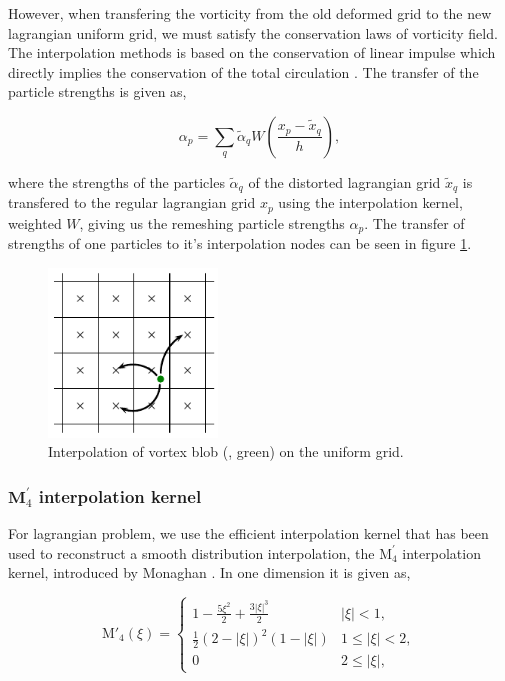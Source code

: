 However, when transfering the vorticity from the old deformed grid to the new lagrangian uniform grid, we must satisfy the conservation laws of vorticity field. The interpolation methods is based on the conservation of linear impulse which directly implies the conservation of the total circulation \cite{Cottet2000a}. The transfer of the particle strengths is given as, 

	\begin{equation}
	\alpha_p = \sum_q\tilde{\alpha}_q W \left(\frac{x_p - \tilde{x}_q}{h}\right),	
	\end{equation}

where the strengths of the particles $\tilde{\alpha}_q$ of the distorted lagrangian grid $\tilde{x}_q$ is transfered to the regular lagrangian grid $x_p$ using the interpolation kernel, weighted $W$, giving us the remeshing particle strengths $\alpha_p$. The transfer of strengths of one particles to it's interpolation nodes can be seen in figure \ref{fig:interpolationGrid}.


	\begin{figure}[t]
	\centering
	\includegraphics[width=0.4\textwidth]{figures/lagrangian/interpolationGrid.pdf}
	\caption{Interpolation of vortex blob ({\color{plotGreen}{$\bullet$}}, green) on the uniform grid.}
	\label{fig:interpolationGrid}
	\end{figure}

\subsubsection*{$\mathbf{M}^\prime_4$ interpolation kernel}
For lagrangian problem, we use the efficient interpolation kernel that has been used to reconstruct a smooth distribution interpolation, the $\mathrm{M}^{\prime}_4$ interpolation kernel, introduced by Monaghan \cite{Monaghan1985}. In one dimension it is given as,

	\begin{equation}
	{\mathrm{M'}_4}\left( {\xi} \right) =
	  \begin{cases}
	   {1 - \frac{{5{\xi ^2}}}{2} + \frac{{3{{\left| \xi  \right|}^3}}}{2}} & {\left| \xi \right|} < 1, \\
	   \frac{1}{2}{\left( {2 - \left| \xi  \right|} \right)^2}\left( {1 - \left| \xi  \right|} \right) & 1 \le {\left| \xi \right|} < 2,\\
	   0 & 2 \le \left| \xi \right|,
	  \end{cases}
	\label{eq:interpKernel}
	\end{equation}

